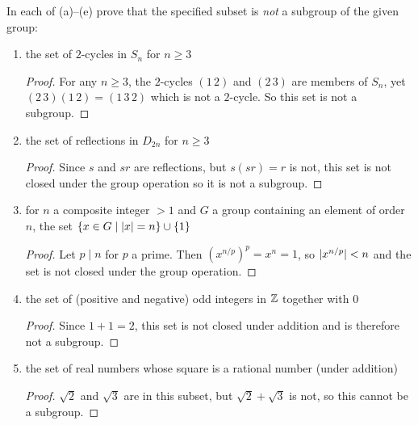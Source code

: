  In each of (a)--(e) prove that the specified subset is {\em
  not} a subgroup of the given group:
\begin{enumerate}
\item the set of $2$-cycles in $S_n$ for $n\geq3$
  \begin{proof}
    For any $n\geq3$, the $2$-cycles $(1\,2)$ and $(2\,3)$ are members
    of $S_n$, yet $(2\,3)(1\,2) = (1\,3\,2)$ which is not a
    $2$-cycle. So this set is not a subgroup.
  \end{proof}
\item the set of reflections in $D_{2n}$ for $n\geq3$
  \begin{proof}
    Since $s$ and $sr$ are reflections, but $s(sr) = r$ is not, this
    set is not closed under the group operation so it is not a
    subgroup.
  \end{proof}
\item for $n$ a composite integer $>1$ and $G$ a group containing an
  element of order $n$, the set $\{x\in G\mid\lvert{x}\rvert=n\}\cup\{1\}$
  \begin{proof}
    Let $p\mid n$ for $p$ a prime. Then $(x^{n/p})^p = x^n = 1$, so
    $\lvert{x^{n/p}}\rvert<n$ and the set is not closed under the group
    operation.
  \end{proof}
\item the set of (positive and negative) odd integers in $\mathbb{Z}$ together
  with $0$
  \begin{proof}
    Since $1 + 1 = 2$, this set is not closed under addition and is
    therefore not a subgroup.
  \end{proof}
\item the set of real numbers whose square is a rational number (under
  addition)
  \begin{proof}
    $\sqrt2$ and $\sqrt3$ are in this subset, but $\sqrt2 + \sqrt3$ is
    not, so this cannot be a subgroup.
  \end{proof}
\end{enumerate}

